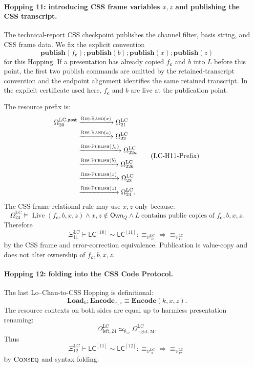 \documentclass{report}
\theoremstyle{defn_style}
\providecommand{\Live}{\operatorname{Live}}
\providecommand{\HopLC}[1]{\mathsf{LC}^{[#1]}}
\begin{document}
\paragraph{Hopping 11: introducing CSS frame variables \(x,z\) and publishing the CSS transcript.}
The technical-report CSS checkpoint publishes the channel filter, basis string,
and CSS frame data.  We fix the explicit convention
\[
  \mathbf{publish}(f_{\mathbf c});
  \mathbf{publish}(b);
  \mathbf{publish}(x);
  \mathbf{publish}(z)
\]
for this Hopping.  If a presentation has already copied \(f_{\mathbf c}\) and
\(b\) into \(L\) before this point, the first two publish commands are omitted by
the retained-transcript convention and the endpoint alignment identifies the
same retained transcript.  In the explicit certificate used here, \(f_{\mathbf c}\)
and \(b\) are live at the publication point.

The resource prefix is:
\[
\begin{aligned}
\Omega^{\mathrm{LC},\mathsf{post}}_{20}
&\xrightarrow{\textsc{Res-Rand}(x)}
\Omega^{\mathrm{LC}}_{21}
\\
&\xrightarrow{\textsc{Res-Rand}(z)}
\Omega^{\mathrm{LC}}_{22}
\\
&\xrightarrow{\textsc{Res-Publish}(f_{\mathbf c})}
\Omega^{\mathrm{LC}}_{22a}
\\
&\xrightarrow{\textsc{Res-Publish}(b)}
\Omega^{\mathrm{LC}}_{22b}
\\
&\xrightarrow{\textsc{Res-Publish}(x)}
\Omega^{\mathrm{LC}}_{23}
\\
&\xrightarrow{\textsc{Res-Publish}(z)}
\Omega^{\mathrm{LC}}_{24}.
\end{aligned}
\tag{LC-H11-Prefix}\label{LC-H11-Prefix}
\]
The CSS-frame relational rule may use \(x,z\) only because:
\[
\Omega^{\mathrm{LC}}_{24}
\models
\Live(f_{\mathbf c},b,x,z)
\land
x,z\notin\mathsf{Own}_Q
\land
L\ \text{contains public copies of }f_{\mathbf c},b,x,z.
\tag{LC-H11-FrameReq}
\]
Therefore
\[
\Xi^{\mathrm{LC}}_{11}
\vdash
\HopLC{10}\sim\HopLC{11}:
\equiv_{\mathcal V^{\mathrm{LC}}_{10}}
\Longrightarrow
\equiv_{\mathcal V^{\mathrm{LC}}_{11}}
\tag{LC-H11-Rel}
\]
by the CSS frame and error-correction equivalence.  Publication is value-copy
and does not alter ownership of \(f_{\mathbf c},b,x,z\).

\paragraph{Hopping 12: folding into the CSS Code Protocol.}
The last Lo--Chau-to-CSS Hopping is definitional:
\[
\mathbf{Load}_{k};\mathbf{Encode}_{x,z}
\equiv
\mathbf{Encode}(k,x,z).
\]
The resource contexts on both sides are equal up to harmless presentation
renaming:
\[
\Omega^{\mathrm{LC}}_{\mathrm{left},24}
\simeq_{\theta_{12}}
\Omega^{\mathrm{LC}}_{\mathrm{right},24}.
\tag{LC-H12-ResourceAlign}\label{LC-H12-ResourceAlign}
\]
Thus
\[
\Xi^{\mathrm{LC}}_{12}
\vdash
\HopLC{11}\sim\HopLC{12}:
\equiv_{\mathcal V^{\mathrm{LC}}_{11}}
\Longrightarrow
\equiv_{\mathcal V^{\mathrm{LC}}_{12}}
\tag{LC-H12-Rel}
\]
by \(\textsc{Conseq}\) and syntax folding.
\end{document}
